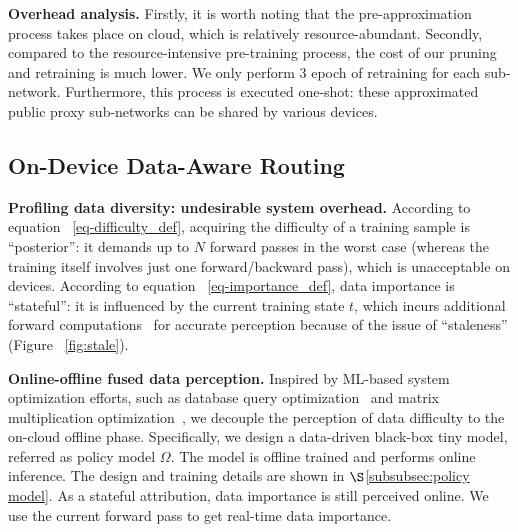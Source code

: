 

\noindent \textbf{Overhead analysis.}
Firstly, it is worth noting that the pre-approximation process takes place on cloud, which is relatively resource-abundant.
Secondly, compared to the resource-intensive pre-training process, the cost of our pruning and retraining is much lower.
We only perform 3 epoch of retraining for each sub-network.
Furthermore, this process is executed one-shot: these approximated public proxy sub-networks can be shared by various devices.

\subsection{On-Device Data-Aware Routing}
\label{subsec:data-aware training}

\noindent \textbf{Profiling data diversity: undesirable system overhead.}
According to equation ~\ref{eq-difficulty_def}, acquiring the difficulty of a training sample is ``posterior'': it demands up to $N$ forward passes in the worst case (whereas the training itself involves just one forward/backward pass), which is unacceptable on devices.
According to equation ~\ref{eq-importance_def}, data importance is ``stateful'': it is influenced by the current training state $t$, which incurs additional forward computations~\cite{mercury2021sensys} for accurate perception because of the issue of ``staleness'' (Figure ~\ref{fig:stale}).

\noindent \textbf{Online-offline fused data perception.}
Inspired by ML-based system optimization efforts, such as database query optimization~\cite{marcus2021bao, negi2021steering} and matrix multiplication optimization~\cite{fawzi2022discovering}, we decouple the perception of data difficulty to the on-cloud offline phase.
Specifically, we design a data-driven black-box tiny model, referred as policy model $\Omega$.
The model is offline trained and performs online inference.
The design and training details are shown in $\S$\ref{subsubsec:policy model}.
As a stateful attribution, data importance is still perceived online.
We use the current forward pass to get real-time data importance.

